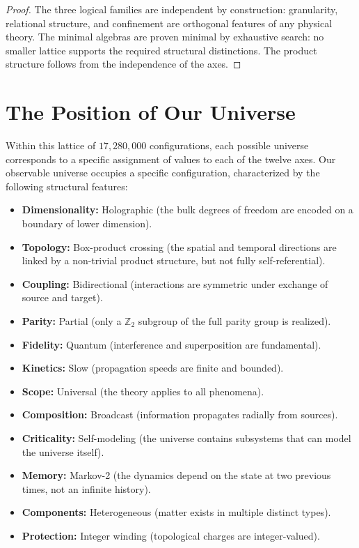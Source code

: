 \documentclass[11pt,a4paper]{article}
\theoremstyle{definition}
\begin{document}
\begin{proof}
The three logical families are independent by construction: granularity, relational structure, and confinement are orthogonal features of any physical theory. The minimal algebras are proven minimal by exhaustive search: no smaller lattice supports the required structural distinctions. The product structure follows from the independence of the axes.
\end{proof}

\section{The Position of Our Universe}

Within this lattice of \(17,280,000\) configurations, each possible universe corresponds to a specific assignment of values to each of the twelve axes. Our observable universe occupies a specific configuration, characterized by the following structural features:

\begin{itemize}
    \item \textbf{Dimensionality:} Holographic (the bulk degrees of freedom are encoded on a boundary of lower dimension).
    \item \textbf{Topology:} Box-product crossing (the spatial and temporal directions are linked by a non-trivial product structure, but not fully self-referential).
    \item \textbf{Coupling:} Bidirectional (interactions are symmetric under exchange of source and target).
    \item \textbf{Parity:} Partial (only a \(\mathbb{Z}_2\) subgroup of the full parity group is realized).
    \item \textbf{Fidelity:} Quantum (interference and superposition are fundamental).
    \item \textbf{Kinetics:} Slow (propagation speeds are finite and bounded).
    \item \textbf{Scope:} Universal (the theory applies to all phenomena).
    \item \textbf{Composition:} Broadcast (information propagates radially from sources).
    \item \textbf{Criticality:} Self-modeling (the universe contains subsystems that can model the universe itself).
    \item \textbf{Memory:} Markov-2 (the dynamics depend on the state at two previous times, not an infinite history).
    \item \textbf{Components:} Heterogeneous (matter exists in multiple distinct types).
    \item \textbf{Protection:} Integer winding (topological charges are integer-valued).
\end{itemize}
\end{document}
